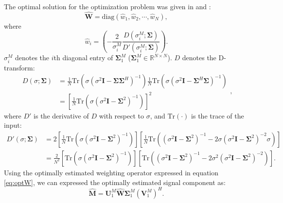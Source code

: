 The optimal solution for the optimization problem was given in \cite{Benaych2012The} and \cite{optshrink2013}:
\begin{equation}
\label{eq:optW}
\hat{\mathbf{W}} = \text{diag}(\hat{w}_1,\hat{w}_2,\cdots,\hat{w}_N),
\end{equation}
where
\begin{equation}
\label{eq:optw}
\hat{w}_i=\left(-\frac{2}{\sigma_i^M}\frac{D(\sigma_i^M;\boldsymbol{\Sigma})}{D'(\sigma_i^M;\boldsymbol{\Sigma})}\right).
\end{equation}
$\sigma_i^M$ denotes the $i$th diagonal entry of $\boldsymbol{\Sigma}_1^M$ ($\boldsymbol{\Sigma}_1^M\in\mathbb{R}^{N\times N}$). $D$ denotes the D-transform:
\begin{equation}
\label{eq:D1}
\begin{split}
D(\sigma;\boldsymbol{\Sigma})&= \frac{1}{N} \text{Tr}\left(\sigma(\sigma^2\mathbf{I}-\boldsymbol{\Sigma}\boldsymbol{\Sigma}^H)^{-1}\right)\frac{1}{N} \text{Tr}\left(\sigma(\sigma^2\mathbf{I}-\boldsymbol{\Sigma}^H\boldsymbol{\Sigma})^{-1}\right)\\
&=\left[\frac{1}{N} \text{Tr}\left(\sigma(\sigma^2\mathbf{I}-\boldsymbol{\Sigma}^2)^{-1}\right)\right]^2
\end{split},
\end{equation}
where $D'$ is the derivative of $D$ with respect to $\sigma$, and $\text{Tr}(\cdot)$ is the trace of the input:
\begin{equation}
\label{eq:D2}
\begin{split}
D'(\sigma;\boldsymbol{\Sigma})&= 2\left[\frac{1}{N} \text{Tr}\left(\sigma(\sigma^2\mathbf{I}-\boldsymbol{\Sigma}^2)^{-1}\right)\right]\left[\frac{1}{N} \text{Tr}\left((\sigma^2\mathbf{I}-\boldsymbol{\Sigma}^2)^{-1}-2\sigma(\sigma^2\mathbf{I}-\boldsymbol{\Sigma}^2)^{-2}\sigma\right)\right] \\
&=\frac{2}{N^2}\left[ \text{Tr}\left(\sigma(\sigma^2\mathbf{I}-\boldsymbol{\Sigma}^2)^{-1}\right)\right]\left[ \text{Tr}\left((\sigma^2\mathbf{I}-\boldsymbol{\Sigma}^2)^{-1}-2\sigma^2(\sigma^2\mathbf{I}-\boldsymbol{\Sigma}^2)^{-2}\right)\right].
\end{split}
\end{equation}
Using the optimally estimated weighting operator expressed in equation \ref{eq:optW}, we can expressed the optimally estimated signal component as:
\begin{equation}
\label{eq:M_a}
\hat{\mathbf{M}}=\mathbf{U}_1^M\hat{\mathbf{W}}\boldsymbol{\Sigma}_1^M(\mathbf{V}_1^M)^H.
\end{equation}

